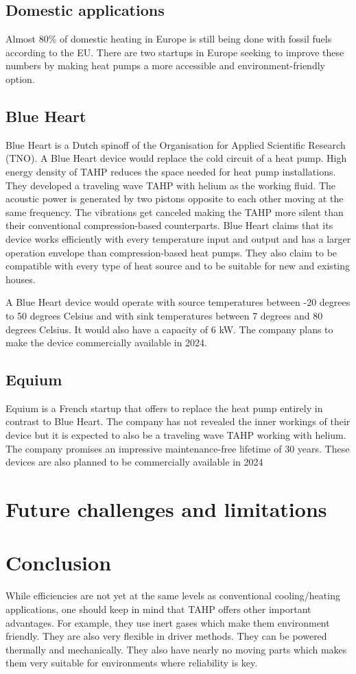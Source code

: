 \documentclass{article}
\newcommand{\newpara}
    {
      \bigbreak{}
      \noindent
    }
\begin{document}
\subsection{Domestic applications}
Almost 80\% of domestic heating in Europe is still being done with fossil fuels according to the EU\cite{EU}. There are two startups in Europe seeking to improve these numbers by making heat pumps a more accessible and environment-friendly option.
\subsection{Blue Heart\cite{blueheart}}
Blue Heart is a Dutch spinoff of the Organisation for Applied Scientific Research (TNO). A Blue Heart device would replace the cold circuit of a heat pump. High energy density of TAHP reduces the space needed for heat pump installations. They developed a traveling wave TAHP with helium as the working fluid. The acoustic power is generated by two pistons opposite to each other moving at the same frequency. The vibrations get canceled making the TAHP more silent than their conventional compression-based counterparts. Blue Heart claims that its device works efficiently with every temperature input and output and has a larger operation envelope than compression-based heat pumps. They also claim to be compatible with every type of heat source and to be suitable for new and existing houses.
\newpara{}
A Blue Heart device would operate with source temperatures between -20 degrees to 50 degrees Celsius and with sink temperatures between 7 degrees and 80 degrees Celsius. It would also have a capacity of 6 kW. The company plans to make the device commercially available in 2024.
\subsection{Equium\cite{equium}}
Equium is a French startup that offers to replace the heat pump entirely in contrast to Blue Heart. The company has not revealed the inner workings of their device but it is expected to also be a traveling wave TAHP working with helium. The company promises an impressive maintenance-free lifetime of 30 years. These devices are also planned to be commercially available in 2024
\section{Future challenges and limitations}

\section{Conclusion}
While efficiencies are not yet at the same levels as conventional cooling/heating applications, one should keep in mind that TAHP offers other important advantages. For example, they use inert gases which make them environment friendly. They are also very flexible in driver methods. They can be powered thermally and mechanically. They also have nearly no moving parts which makes them very suitable for environments where reliability is key.
\newpage


\end{document}
